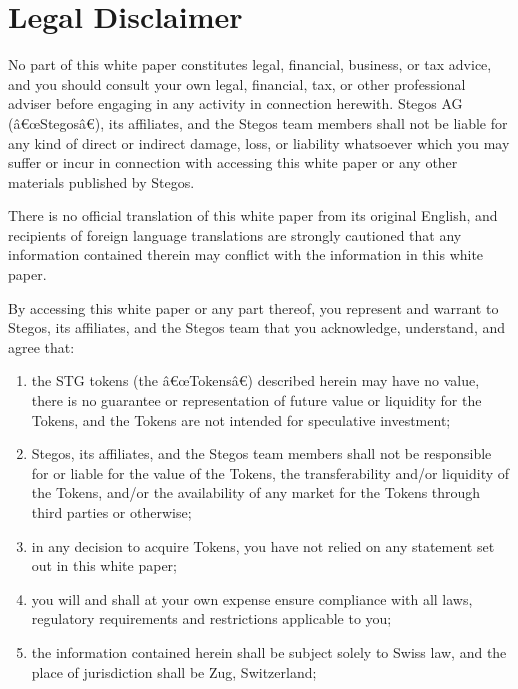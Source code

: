 \documentclass[8pt,fleqn,openany]{book}
\begin{document}
{		\chapter{Legal Disclaimer}
		
		No part of this white paper constitutes legal, financial, business, or tax advice, and you should consult your own legal, financial, tax, or other professional adviser before engaging in any activity in connection herewith. Stegos AG (â€œStegosâ€), its affiliates, and the Stegos team members shall not be liable for any kind of direct or indirect damage, loss, or liability whatsoever which you may suffer or incur in connection with accessing this white paper or any other materials published by Stegos. 
		
		There is no official translation of this white paper from its original English, and recipients of foreign language translations are strongly cautioned that any information contained therein may conflict with the information in this white paper. 
		
		By accessing this white paper or any part thereof, you represent and warrant to Stegos, its affiliates, and the Stegos team that you acknowledge, understand, and agree that: 
		
		\begin{enumerate}[label=(\alph*)]
			\item the STG tokens (the â€œTokensâ€) described herein may have no value, there is no guarantee or representation of future value or liquidity for the Tokens, and the Tokens are not intended for speculative investment; 
			
			\item Stegos, its affiliates, and the Stegos team members shall not be responsible for or liable for the value of the Tokens, the transferability and/or liquidity of the Tokens, and/or the availability of any market for the Tokens through third parties or otherwise; 
			
			\item in any decision to acquire Tokens, you have not relied on any statement set out in this white paper; 
			
			\item you will and shall at your own expense ensure compliance with all laws, regulatory requirements and restrictions applicable to you; 
			
			\item the information contained herein shall be subject solely to Swiss law, and the place of jurisdiction shall be Zug, Switzerland; 
			

\end{enumerate}}
\end{document}
